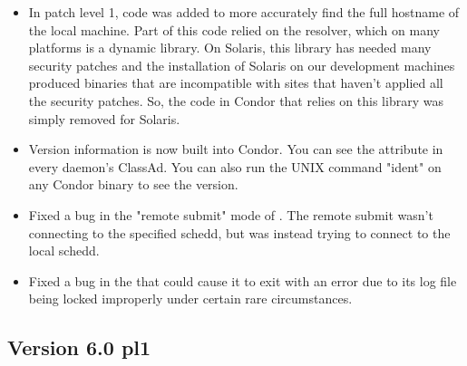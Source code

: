 \begin{itemize}

\item In patch level 1, code was added to more accurately find the
full hostname of the local machine.
Part of this code relied on the resolver, which on many platforms is a
dynamic library.
On Solaris, this library has needed many security patches and the
installation of Solaris on our development machines produced binaries
that are incompatible with sites that haven't applied all the security
patches.
So, the code in Condor that relies on this library was simply removed
for Solaris.

\item Version information is now built into Condor.
You can see the  attribute in every daemon's
ClassAd. 
You can also run the UNIX command "ident" on any Condor binary to see
the version. 

\item Fixed a bug in the "remote submit" mode of .
The remote submit wasn't connecting to the specified schedd, but was
instead trying to connect to the local schedd.

\item Fixed a bug in the  that could cause it to exit
with an error due to its log file being locked improperly under
certain rare circumstances.

\end{itemize}

\subsection{\label{sec:New-6-0-pl1}Version 6.0 pl1}


